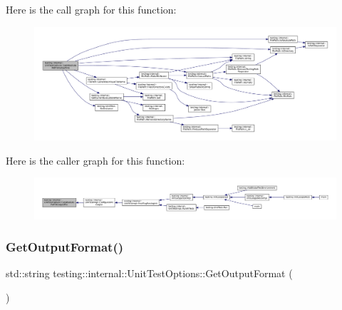 Here is the call graph for this function\+:
\nopagebreak
\begin{figure}[H]
\begin{center}
\leavevmode
\includegraphics[width=350pt]{classtesting_1_1internal_1_1UnitTestOptions_a993fb30ad66104158c8c0ac508daca3f_cgraph}
\end{center}
\end{figure}
Here is the caller graph for this function\+:
\nopagebreak
\begin{figure}[H]
\begin{center}
\leavevmode
\includegraphics[width=350pt]{classtesting_1_1internal_1_1UnitTestOptions_a993fb30ad66104158c8c0ac508daca3f_icgraph}
\end{center}
\end{figure}
\mbox{\label{classtesting_1_1internal_1_1UnitTestOptions_ae7413a21296d885c6924650b51ac4f6d}} 
\subsubsection{\texorpdfstring{Get\+Output\+Format()}{GetOutputFormat()}}
{\footnotesize\ttfamily std\+::string testing\+::internal\+::\+Unit\+Test\+Options\+::\+Get\+Output\+Format (\begin{DoxyParamCaption}{ }\end{DoxyParamCaption})\hspace{0.3cm}{\ttfamily [static]}}



